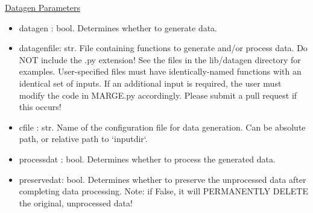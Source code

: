 \documentclass[letterpaper, 12pt]{article}
\begin{document}
\noindent \underline{Datagen Parameters}
\begin{itemize}
\item datagen    : bool. Determines whether to generate data.
\item datagenfile: str.  File containing functions to generate and/or process 
                         data.  Do NOT include the .py extension!
                         See the files in the lib/datagen directory for examples.
                         User-specified files must have identically-named 
                         functions with an identical set of inputs.  If an 
                         additional input is required, the user must modify the 
                         code in MARGE.py accordingly.  
                         Please submit a pull request if this occurs!
\item cfile      : str.  Name of the configuration file for data generation.
                         Can be absolute path, or relative path to `inputdir`.
\item processdat : bool. Determines whether to process the generated data.
\item preservedat: bool. Determines whether to preserve the unprocessed data after 
                   completing data processing.
                   Note: if False, it will PERMANENTLY DELETE the original, 
                         unprocessed data!
\end{itemize}
\end{document}
